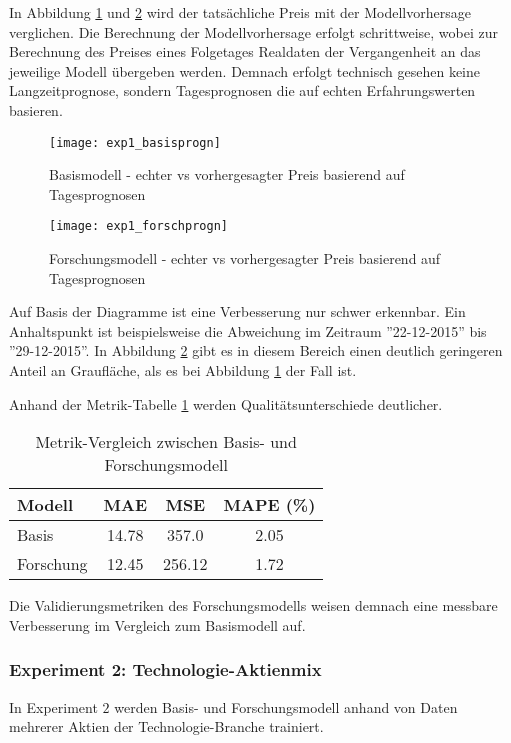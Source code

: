 In Abbildung \ref{fig:exp1_basisprogn} und \ref{fig:exp1_forschprogn} wird der tatsächliche Preis mit der Modellvorhersage verglichen. Die Berechnung der Modellvorhersage erfolgt schrittweise, wobei zur Berechnung des Preises eines Folgetages Realdaten der Vergangenheit an das jeweilige Modell übergeben werden. Demnach erfolgt technisch gesehen keine Langzeitprognose, sondern Tagesprognosen die auf echten Erfahrungswerten basieren.
\begin{figure}[H]
	\texttt{[image: exp1\_basisprogn]}
	\caption{Basismodell - echter vs vorhergesagter Preis basierend auf Tagesprognosen}
	\label{fig:exp1_basisprogn}
\end{figure}
\begin{figure}[H]
	\texttt{[image: exp1\_forschprogn]}
	\caption{Forschungsmodell - echter vs vorhergesagter Preis basierend auf Tagesprognosen}
	\label{fig:exp1_forschprogn}
\end{figure}
Auf Basis der Diagramme ist eine Verbesserung nur schwer erkennbar. Ein Anhaltspunkt ist beispielsweise die Abweichung im Zeitraum ''22-12-2015'' bis ''29-12-2015''. In Abbildung \ref{fig:exp1_forschprogn} gibt es in diesem Bereich einen deutlich geringeren Anteil an Graufläche, als es bei Abbildung \ref{fig:exp1_basisprogn} der Fall ist.

Anhand der Metrik-Tabelle \ref{tbl:exp1_model_metrics} werden Qualitätsunterschiede deutlicher.
\begin{table}[H]
	\centering
	\caption{Metrik-Vergleich zwischen Basis- und Forschungsmodell}
	\label{tbl:exp1_model_metrics}
	\begin{tabular}{lccc}
		\hline
		\textbf{Modell} & \textbf{MAE} & \textbf{MSE} & \textbf{MAPE (\%)} \\
		\hline
		Basis & 14.78 & 357.0 & 2.05 \\
		Forschung & 12.45 & 256.12 & 1.72 \\
		\hline
	\end{tabular}
\end{table}
Die Validierungsmetriken des Forschungsmodells weisen demnach eine messbare Verbesserung im Vergleich zum Basismodell auf.

\subsubsection{Experiment 2: Technologie-Aktienmix}\label{sec:evaluierung_exp2}
In Experiment $2$ werden Basis- und Forschungsmodell anhand von Daten mehrerer Aktien der Technologie-Branche trainiert.

